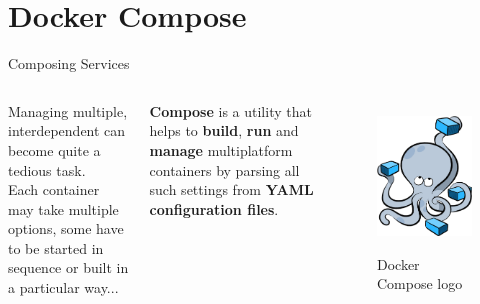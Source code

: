 
\section{Docker Compose}
\graphicspath{{figs/section3/}}

\begin{frame}{Composing Services}
\begin{columns}
  Managing multiple, interdependent  can become quite a tedious task.\\
  Each container may take multiple options, some have to be started in sequence or built in a particular way...\\
  \begin{block}{}
    \centering
    \textbf{Compose} is a utility that helps to \textbf{build}, \textbf{run} and \textbf{manage} multiplatform containers by parsing all such settings from \textbf{YAML configuration files}.
  \end{block}

  \begin{figure}
    \centering
    \includegraphics[scale=.2]{composeLogo.png}
    \label{fig:compose}
    \caption{Docker Compose logo}
  \end{figure}
\end{columns}
\end{frame}

